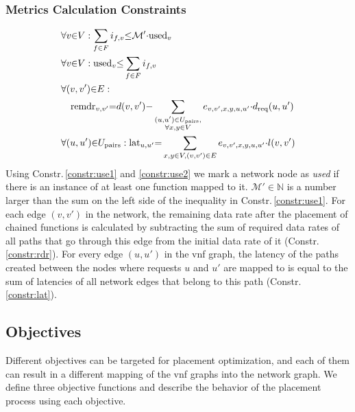 \documentclass[10pt,a4paper,conference]{IEEEtran}
\begin{document}
\subsubsection{Metrics Calculation Constraints}
{\footnotesize
\begin{align}
  & \forall v {\in} V : \sum_{f {\in} F} i_{f,v} {\leq} \mathcal{M'} {\cdot} \text{used}_{v}  \label{constr:use1} \\
  & \forall v {\in} V : \text{used}_{v} {\leq} \sum_{f {\in} F} i_{f,v}  \label{constr:use2} \\
& \forall (v,v') {\in} E : \notag\\
  & \quad \text{remdr}_{v,v'} {=} d(v,v') {-} \sum_{\substack{(u,u') {\in} U_\text{pairs}, \\ \forall x,y {\in} V}} e_{v,v',x,y,u,u'} {\cdot} d_\text{req}(u,u') \label{constr:rdr} \\
& \forall (u,u') {\in} U_\text{pairs} : \text{lat}_{u,u'} {=} \sum_{x,y {\in} V, (v,v') {\in} E} e_{v,v',x,y,u,u'} {\cdot} l(v,v')  \label{constr:lat}
\end{align}
}Using Constr.\,\ref{constr:use1} and \ref{constr:use2} we mark a network node
as \emph{used} if there is an instance of at least one function mapped to it.
$ \mathcal{M'} {\in} \mathbb{N} $ is a number larger than the sum on the left side 
of the inequality in Constr.\,\ref{constr:use1}. For each edge $ (v,v') $ in the
network, the remaining data rate after the placement of chained functions is calculated
by subtracting the sum of required data rates of all paths that go through this 
edge from the initial data rate of it (Constr.\,\ref{constr:rdr}). For every
edge $ (u,u') $ in the \ac{vnf} graph, the latency of the paths created between the 
nodes where requests $ u $ and $ u' $ are mapped to is equal to the sum of latencies
of all network edges that belong to this path (Constr.\,\ref{constr:lat}).

\subsection{Objectives}
\label{subsec:objective}

Different objectives can be targeted for placement optimization, and
each of them can result in a different mapping of the \ac{vnf} graphs into the 
network graph. We define three objective functions and describe 
the behavior of the placement process using each objective.
\end{document}
